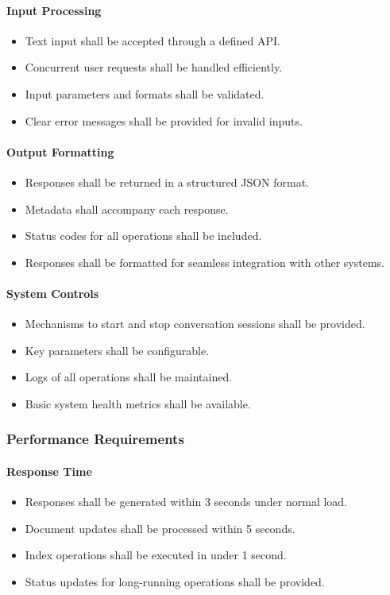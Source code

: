 \documentclass[12pt,a4paper]{report}
\begin{document}
\paragraph{Input Processing}
\begin{itemize}
    \item Text input shall be accepted through a defined API.
    \item Concurrent user requests shall be handled efficiently.
    \item Input parameters and formats shall be validated.
    \item Clear error messages shall be provided for invalid inputs.
\end{itemize}

\paragraph{Output Formatting}
\begin{itemize}
    \item Responses shall be returned in a structured JSON format.
    \item Metadata shall accompany each response.
    \item Status codes for all operations shall be included.
    \item Responses shall be formatted for seamless integration with other systems.
\end{itemize}

\paragraph{System Controls}
\begin{itemize}
    \item Mechanisms to start and stop conversation sessions shall be provided.
    \item Key parameters shall be configurable.
    \item Logs of all operations shall be maintained.
    \item Basic system health metrics shall be available.
\end{itemize}

\subsubsection{Performance Requirements}
\paragraph{Response Time}
\begin{itemize}
    \item Responses shall be generated within 3 seconds under normal load.
    \item Document updates shall be processed within 5 seconds.
    \item Index operations shall be executed in under 1 second.
    \item Status updates for long-running operations shall be provided.
\end{itemize}
\end{document}
